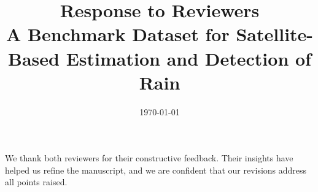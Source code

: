 \documentclass[a4paper]{article}
\title{
	Response to Reviewers\\
	\normalsize \vspace{\baselineskip}
	A Benchmark Dataset for Satellite-Based Estimation and Detection of Rain
}
\date{\today}
\begin{document}
\maketitle


We thank both reviewers for their constructive feedback. Their insights have
helped us refine the manuscript, and we are confident that our revisions address
all points raised.








\end{document}
